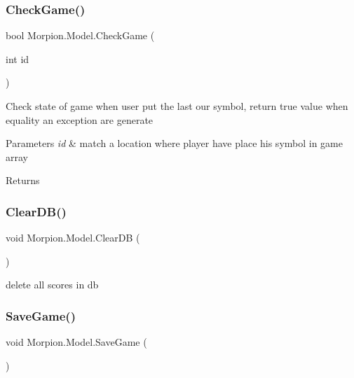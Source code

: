 \subsubsection{\texorpdfstring{Check\+Game()}{CheckGame()}}
{\footnotesize\ttfamily bool Morpion.\+Model.\+Check\+Game (\begin{DoxyParamCaption}\item[{int}]{id }\end{DoxyParamCaption})}



Check state of game when user put the last our symbol, return true value when equality an exception are generate 


\begin{DoxyParams}{Parameters}
{\em id} & match a location where player have place his symbol in game array\\
\hline
\end{DoxyParams}
\begin{DoxyReturn}{Returns}

\end{DoxyReturn}
\mbox{\label{class_morpion_1_1_model_ab5dee79623ee37ae8ccb63bade900dcf}} 
\subsubsection{\texorpdfstring{Clear\+D\+B()}{ClearDB()}}
{\footnotesize\ttfamily void Morpion.\+Model.\+Clear\+DB (\begin{DoxyParamCaption}{ }\end{DoxyParamCaption})}



delete all scores in db 

\mbox{\label{class_morpion_1_1_model_af97f1128b5beaa34f151304c84ee1a80}} 
\subsubsection{\texorpdfstring{Save\+Game()}{SaveGame()}}
{\footnotesize\ttfamily void Morpion.\+Model.\+Save\+Game (\begin{DoxyParamCaption}{ }\end{DoxyParamCaption})}



